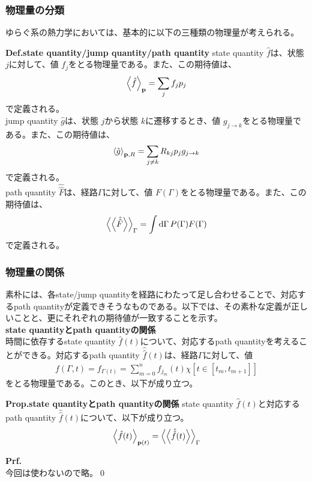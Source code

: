 \documentclass[a4paper,11pt]{jsarticle}
\numberwithin{equation}{section}
\begin{document}
\subsubsection{物理量の分類}
ゆらぐ系の熱力学においては、基本的に以下の三種類の物理量が考えられる。\\
\begin{itembox}[l]{\textbf{Def.state quantity/jump quantity/path quantity}}
    state quantity $\hat{f}$は、状態 $j$に対して、値 $f_j$をとる物理量である。また、この期待値は、
    \begin{align}
        \ev{\hat{f}}_{\vb{p}} = \sum_{j} f_j p_j
    \end{align}
    で定義される。\\

    jump quantity $\hat{g}$は、状態 $j$から状態 $k$に遷移するとき、値 $g_{j\to k}$をとる物理量である。また、この期待値は、
    \begin{align}
        \ev{\hat{g}}_{\vb{p},R} = \sum_{j\neq k} R_{kj} p_j g_{j\to k}
    \end{align}
    で定義される。\\

    path quantity $\hat{\hat{F}}$は、経路$\Gamma$に対して、値 $F({\Gamma})$をとる物理量である。また、この期待値は、
    \begin{align}
        \ev{\ev{\hat{\hat{F}}}}_{\Gamma} = \int \dd{\Gamma} P(\Gamma) F(\Gamma)
    \end{align}
    で定義される。
\end{itembox}

\subsubsection{物理量の関係}
素朴には、各state/jump quantityを経路にわたって足し合わせることで、対応するpath quantityが定義できそうなものである。以下では、その素朴な定義が正しいことと、更にそれぞれの期待値が一致することを示す。\\

\noindent
\textbf{state quantityとpath quantityの関係}\\
時間に依存するstate quantity $\hat{f}(t)$について、対応するpath quantityを考えることができる。対応するpath quantity $\hat{\hat{f}}(t)$は、経路$\Gamma$に対して、値
\begin{align}
    f(\Gamma,t) = f_{\Gamma(t)} = \sum_{m=0}^{n} f_{j_{m}}(t) \chi[t \in [t_{m},t_{m+1}]]
\end{align}
をとる物理量である。このとき、以下が成り立つ。
\begin{itembox}[l]{\textbf{Prop.state quantityとpath quantityの関係}}
    state quantity $\hat{f}(t)$と対応するpath quantity $\hat{\hat{f}}(t)$について、以下が成り立つ。
    \begin{align}
        \ev{\hat{f}(t)}_{\vb{p}(t)} = \ev{\ev{\hat{\hat{f}}(t)}}_{\Gamma}
    \end{align}
\end{itembox}
\textbf{Prf.}\\
今回は使わないので略。\qed\\
\end{document}

